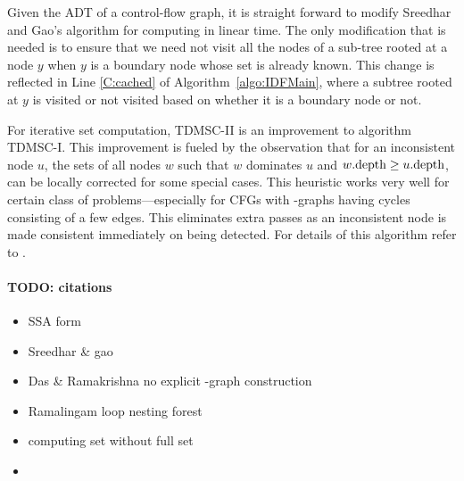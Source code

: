 {Given the ADT of a control-flow graph, it is straight forward to modify Sreedhar and Gao's algorithm for computing \phifuns in linear time. 
The only modification that is needed is to ensure that we need not visit all the nodes of a sub-tree rooted at a node $y$ when $y$ is a boundary node whose \DF set is already known. 
This change is reflected in Line \ref{C:cached} of Algorithm~\ref{algo:IDFMain}, where a subtree rooted at $y$ is visited or not visited based on whether it is a boundary node or not.

For iterative \iDF set computation, TDMSC-II is an improvement to algorithm TDMSC-I. 
This improvement is fueled by the observation that for an inconsistent node $u$, the \iDF sets of all nodes $w$ such that $w$ dominates $u$ and $w.\textrm{depth} \geq u.\textrm{depth}$, can be locally corrected for some special cases. 
This heuristic works very well for certain class of problems---especially for CFGs with \DF-graphs having cycles consisting of a few edges. 
This eliminates extra passes as an inconsistent node is made consistent immediately on being detected. 
For details of this algorithm refer to \cite{das}.


\paragraph{TODO: citations}
\begin{itemize}
  \item SSA form \cite{cfr}
  \item Sreedhar \& gao \cite{sreedhar_popl}
  \item Das \& Ramakrishna no explicit \DF-graph construction  \cite{das}
  \item Ramalingam loop nesting forest  \cite{rama}
  \item computing \iDF set without full \DF set \cite{sreedhar_popl,sreedharthesis}
  \item \cite{bilardi} 
\end{itemize}
}
